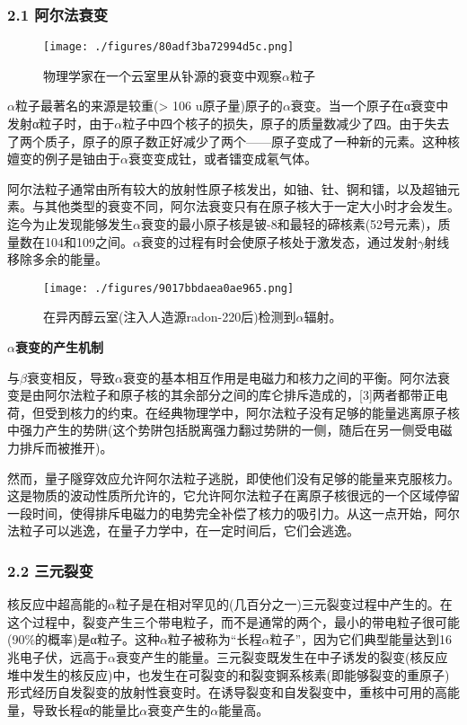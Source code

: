 \subsubsection{2.1 阿尔法衰变}
\begin{figure}[ht]
\centering
\texttt{[image: ./figures/80adf3ba72994d5c.png]}
\caption{物理学家在一个云室里从钋源的衰变中观察$\alpha$粒子} \label{fig_ALZ_1}
\end{figure}
$\alpha$粒子最著名的来源是较重(> 106 u原子量)原子的$\alpha$衰变。当一个原子在α衰变中发射α粒子时，由于$\alpha$粒子中四个核子的损失，原子的质量数减少了四。由于失去了两个质子，原子的原子数正好减少了两个——原子变成了一种新的元素。这种核嬗变的例子是铀由于$\alpha$衰变变成钍，或者镭变成氡气体。

阿尔法粒子通常由所有较大的放射性原子核发出，如铀、钍、锕和镭，以及超铀元素。与其他类型的衰变不同，阿尔法衰变只有在原子核大于一定大小时才会发生。迄今为止发现能够发生$\alpha$衰变的最小原子核是铍-8和最轻的碲核素(52号元素)，质量数在104和109之间。$\alpha$衰变的过程有时会使原子核处于激发态，通过发射$\gamma$射线移除多余的能量。
\begin{figure}[ht]
\centering
\texttt{[image: ./figures/9017bbdaea0ae965.png]}
\caption{在异丙醇云室(注入人造源radon-220后)检测到$\alpha$辐射。} \label{fig_ALZ_2}
\end{figure}

\textbf{$\alpha$衰变的产生机制}

与$\beta$衰变相反，导致$\alpha$衰变的基本相互作用是电磁力和核力之间的平衡。阿尔法衰变是由阿尔法粒子和原子核的其余部分之间的库仑排斥造成的，[3]两者都带正电荷，但受到核力的约束。在经典物理学中，阿尔法粒子没有足够的能量逃离原子核中强力产生的势阱(这个势阱包括脱离强力翻过势阱的一侧，随后在另一侧受电磁力排斥而被推开)。

然而，量子隧穿效应允许阿尔法粒子逃脱，即使他们没有足够的能量来克服核力。这是物质的波动性质所允许的，它允许阿尔法粒子在离原子核很远的一个区域停留一段时间，使得排斥电磁力的电势完全补偿了核力的吸引力。从这一点开始，阿尔法粒子可以逃逸，在量子力学中，在一定时间后，它们会逃逸。
\subsubsection{2.2 三元裂变}
核反应中超高能的$\alpha$粒子是在相对罕见的(几百分之一)三元裂变过程中产生的。在这个过程中，裂变产生三个带电粒子，而不是通常的两个，最小的带电粒子很可能(90\%的概率)是α粒子。这种$\alpha$粒子被称为“长程$\alpha$粒子”，因为它们典型能量达到16兆电子伏，远高于$\alpha$衰变产生的能量。三元裂变既发生在中子诱发的裂变(核反应堆中发生的核反应)中，也发生在可裂变的和裂变锕系核素(即能够裂变的重原子)形式经历自发裂变的放射性衰变时。在诱导裂变和自发裂变中，重核中可用的高能量，导致长程α的能量比$\alpha$衰变产生的$\alpha$能量高。
